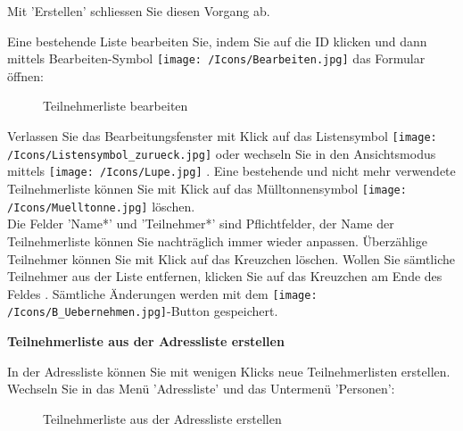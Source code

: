 Mit 'Erstellen' schliessen Sie diesen Vorgang ab. 

\vspace{\baselineskip}

Eine bestehende Liste bearbeiten Sie, indem Sie auf die ID  klicken und dann mittels Bearbeiten-Symbol \texttt{[image: /Icons/Bearbeiten.jpg]}  das Formular öffnen:

\begin{figure}[H]
\caption{Teilnehmerliste bearbeiten}
\end{figure}

Verlassen Sie das Bearbeitungsfenster mit Klick auf das Listensymbol \texttt{[image: /Icons/Listensymbol\_zurueck.jpg]}  oder wechseln Sie in den Ansichtsmodus mittels \texttt{[image: /Icons/Lupe.jpg]} . Eine bestehende und nicht mehr verwendete Teilnehmerliste können Sie mit Klick auf das Mülltonnensymbol \texttt{[image: /Icons/Muelltonne.jpg]}  löschen.\\
Die Felder 'Name*'  und 'Teilnehmer*'  sind Pflichtfelder, der Name der Teilnehmerliste können Sie nachträglich immer wieder anpassen. Überzählige Teilnehmer können Sie mit Klick auf das Kreuzchen  löschen. Wollen Sie sämtliche Teilnehmer aus der Liste entfernen, klicken Sie auf das Kreuzchen am Ende des Feldes . Sämtliche Änderungen werden mit dem \texttt{[image: /Icons/B\_Uebernehmen.jpg]}-Button  gespeichert.

\vspace{\baselineskip}

\textbf{Teilnehmerliste aus der Adressliste erstellen}
\label{bkm:Ref20190313001}

\vspace{\baselineskip}

In der Adressliste können Sie mit wenigen Klicks neue Teilnehmerlisten erstellen. Wechseln Sie in das Menü 'Adressliste' und das Untermenü 'Personen':

\begin{figure}[H]
\caption{Teilnehmerliste aus der Adressliste erstellen}
\end{figure}

